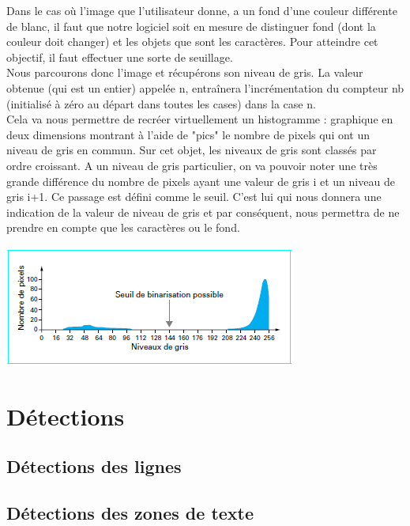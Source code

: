 \documentclass [french,12pt]{article}
\begin{document}
Dans le cas où l'image que l'utilisateur donne, a un fond d'une couleur différente de blanc, il faut que notre logiciel soit en mesure de distinguer fond (dont la couleur doit changer) et les objets que sont les caractères. 
Pour atteindre cet objectif, il faut effectuer une sorte de seuillage. \\
Nous parcourons donc l'image et récupérons son niveau de gris. La valeur obtenue (qui est un entier) appelée n, entraînera l'incrémentation du compteur nb (initialisé à zéro au départ dans toutes les cases) dans la case n. \\
Cela va nous permettre de recréer virtuellement un histogramme : graphique en deux dimensions montrant à l'aide de "pics" le nombre de pixels qui ont un niveau de gris en commun. Sur cet objet, les niveaux de gris sont classés par ordre croissant.  A un niveau de gris particulier, on va pouvoir noter une très grande différence du nombre de pixels ayant une valeur de gris i et un niveau de gris i+1. Ce passage est défini comme le seuil. C'est lui qui nous donnera une indication de la valeur de niveau de gris et par conséquent, nous permettra de ne prendre en compte que les caractères ou le fond.\\

\begin{center} \includegraphics[scale=1.50]{seuil} \end{center}

\newpage

\section{Détections}
\subsection{Détections des lignes}
\subsection{Détections des zones de texte}
\end{document}
